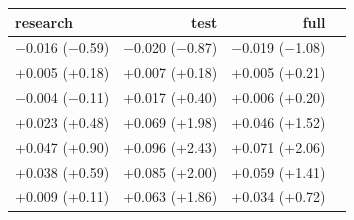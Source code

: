 \begin{tabular}{lrrr}
\toprule
research & test & full \\
\midrule
$-$0.016 ($-$0.59) & $-$0.020 ($-$0.87) & $-$0.019 ($-$1.08) \\
+0.005 (+0.18) & +0.007 (+0.18) & +0.005 (+0.21) \\
$-$0.004 ($-$0.11) & +0.017 (+0.40) & +0.006 (+0.20) \\
+0.023 (+0.48) & +0.069 (+1.98) & +0.046 (+1.52) \\
+0.047 (+0.90) & +0.096 (+2.43) & +0.071 (+2.06) \\
+0.038 (+0.59) & +0.085 (+2.00) & +0.059 (+1.41) \\
+0.009 (+0.11) & +0.063 (+1.86) & +0.034 (+0.72) \\
\bottomrule
\end{tabular}
